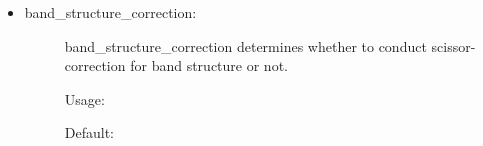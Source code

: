 \documentclass[letterpaper,10pt,english]{sphinxmanual}
\begin{document}
\begin{itemize}
\begin{description}
\begin{sphinxVerbatim}[commandchars=\\\{\}]
   
\end{sphinxVerbatim}

\end{description}

\item {} \begin{description}
\item[{band\_structure\_correction:}] \leavevmode
band\_structure\_correction determines whether to conduct scissor-correction for band structure or not.

Usage:

\begin{sphinxVerbatim}[commandchars=\\\{\}]
     
\end{sphinxVerbatim}

Default:

\begin{sphinxVerbatim}[commandchars=\\\{\}]
   
\end{sphinxVerbatim}

\end{description}

\end{itemize}
\end{document}
